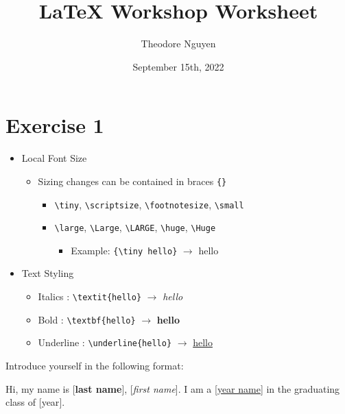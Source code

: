 \documentclass{article}
\title{\LaTeX{} Workshop Worksheet}
\author{Theodore Nguyen}
\date{September 15th, 2022}
\begin{document}
    \section*{Exercise 1}
    \begin{mdframed}
        \begin{itemize}
            \item Local Font Size
                \begin{itemize}
                    \item Sizing changes can be contained in braces \verb|{}|
                        \begin{itemize}
                            \item {\tiny \verb|\tiny|}, {\scriptsize
                                \verb|\scriptsize|}, {\footnotesize
                                \verb|\footnotesize|}, {\small \verb|\small|}
                            \item {\large \verb|\large|}, {\Large
                                \verb|\Large|},
                                {\LARGE \verb|\LARGE|}, {\huge \verb|\huge|},
                                {\Huge \verb|\Huge|}
                            \begin{itemize}
                                \item Example: \verb|{\tiny hello}|
                                    $\rightarrow$ {\tiny hello}
                            \end{itemize}
                        \end{itemize}
                \end{itemize}
            \item Text Styling
                \begin{itemize}
                    \item Italics : \verb|\textit{hello}| $\rightarrow$
                        \textit{hello}
                    \item Bold : \verb|\textbf{hello}| $\rightarrow$
                        \textbf{hello}
                    \item Underline : \verb|\underline{hello}| $\rightarrow$
                        \underline{hello}
                \end{itemize}
        \end{itemize}
    \end{mdframed}
    \begin{mdframed}
        Introduce yourself in the following format:

        \bigskip

        {\Huge Hi}, my name is [\textbf{last name}], [\textit{first name}]. I am
        a [\underline{year name}] in the graduating \tiny{class of}
        [\tiny{year}].
    \end{mdframed}
\end{document}
